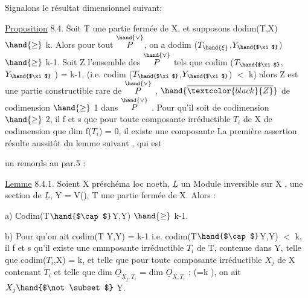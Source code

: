 Signalons le résultat dimensionnel suivant:

\uline{Proposition} 8.4. Soit T une partie fermée de X, et supposons
dodim(T,X) $\hand{\geq}$ k. Alors pour tout \hand{$\xi\in$}$\overset{\hand{\vee}}{P}$, on a dodim ($T_{\hand{\xi}}$,$Y_{\hand{$\xi$}}$) $\hand{\geq}$ k-1. Soit
Z l'ensemble des \hand{$\xi\in$} $\overset{\hand{\vee}}{P}$ tels que codim ($T_{\hand{$\xi$}}$,$Y_{\hand{$\xi$}}$ ) = k-1, (i.e.
codim ($T_{\hand{$\xi$}}$,$Y_{\hand{$\xi$}}$) $<$ k) alors Z est une partie constructible rare de $\overset{\hand{\vee}}{P}$ ,
 $\hand{\overline{\textcolor{black}{Z}}}$  de codimension $\hand{\geq}$ 1 dans $\overset{\hand{\vee}}{P}$ . Pour qu'il soit de
codimension $\hand{\geq}$ 2, il f et s que pour toute composante irréductible
$T_i$ de X de codimension  
que dim f($T_i$) = 0, il existe une composante 
La première assertion résulte aussitôt du lemme suivant , qui est

un remords au par.5 :

\uline{Lemme} 8.4.1. Soient X préschéma loc noeth, $\underline{L}$ un Module inversible sur
X , \hand{$\phi$} une section de $\underline{L}$, Y = V(\hand{$\phi$}), T une partie fermée de X.  Alors :

a) Codim(T$\hand{$\cap$}$Y,Y) $\hand{\geq}$ k-1.

b) Pour qu'on ait codim(T Y,Y) = k-1 i.e. codim(T$\hand{$\cap$}$Y,Y) $<$ k, il
f et s qu'il existe une cmmposante irréductible $T_i$ de T, contenue dans
Y,  telle que codim($T_i$,X) = k, et telle que pour toute composante
irréductible $X_j$ de X  contenant $T_i$ et telle que dim $\underline{O}_{X_j,T_i}$ =
dim $\underline{O}_{X,T_i}$ ; (=k ), on ait $X_j \hand{$\not\subset$}$ Y.

